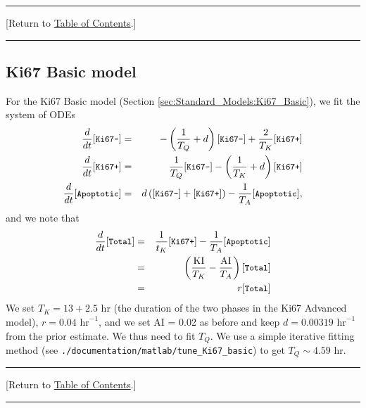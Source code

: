 \documentclass[12pt]{article}
\newcommand{\beqa}{\begin{eqnarray}}
\newcommand{\eeqa}{\end{eqnarray}}
\renewcommand{\v}{\verb}
\renewcommand{\tt}[1]{{\small \left[\texttt{#1}\right] }}
\newcommand{\TOClink}{\begin{center}\hrule\vskip-10pt\phantom{.}\hfill[Return to \hyperlink{TOC}{Table of Contents}.]\hfill\phantom{.}\vskip3pt\hrule\end{center}}
\begin{document}
\TOClink 

\subsection{Ki67 Basic model}
\label{sec:parameters:Ki67_basic}
For the Ki67 Basic model (Section \ref{sec:Standard_Models:Ki67_Basic}), 
we fit the system of ODEs 
\beqa
\frac{d}{dt}\tt{Ki67-} & = & -\left( \frac{1}{T_Q} + d \right) \tt{Ki67-} + \frac{2}{T_K}\tt{Ki67+}  \\
\frac{d}{dt}\tt{Ki67+} & = & \frac{1}{T_Q} \tt{Ki67-} - \left( \frac{1}{T_K} + d \right) \tt{Ki67+} \\
\frac{d}{dt}\tt{Apoptotic} & = & d\left( \tt{Ki67-} + \tt{Ki67+} \right) -\frac{1}{T_A} \tt{Apoptotic}, 
\eeqa
and we note that 
\beqa
\frac{d}{dt}\tt{Total} 
& = & \frac{1}{t_K} \tt{Ki67+} - \frac{1}{T_A} \tt{Apoptotic} \nonumber \\ 
& = & \left( \frac{\textrm{KI}}{T_K} - \frac{\textrm{AI}}{T_A} \right) \tt{Total} \nonumber \\ 
& = & r \tt{Total} 
\eeqa
We set $T_K = 13 + 2.5$ hr (the duration of the two phases in the Ki67 Advanced model), 
$r = 0.04 \textrm{ hr}^{-1}$, and we set AI = 0.02 as before and keep 
$d = 0.00319 \textrm{ hr}^{-1}$ from the prior estimate. We thus need to fit  
$T_Q$. We use a simple iterative fitting method 
(see \v|./documentation/matlab/tune_Ki67_basic|) to get $T_Q \sim 4.59 \textrm{ hr}$. 

\TOClink 
\end{document}
